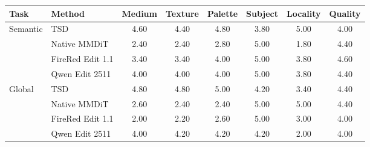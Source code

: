 \begin{tabular}{llcccccc}
\toprule
Task & Method & Medium & Texture & Palette & Subject & Locality & Quality \\
\midrule
Semantic & TSD & 4.60 & 4.40 & 4.80 & 3.80 & 5.00 & 4.00 \\
 & Native MMDiT & 2.40 & 2.40 & 2.80 & 5.00 & 1.80 & 4.40 \\
 & FireRed Edit 1.1 & 3.40 & 3.40 & 4.00 & 5.00 & 3.80 & 4.60 \\
 & Qwen Edit 2511 & 4.00 & 4.00 & 4.00 & 5.00 & 3.80 & 4.40 \\
\midrule
Global & TSD & 4.80 & 4.80 & 5.00 & 4.20 & 3.40 & 4.40 \\
 & Native MMDiT & 2.60 & 2.40 & 2.40 & 5.00 & 5.00 & 4.40 \\
 & FireRed Edit 1.1 & 2.00 & 2.20 & 2.60 & 5.00 & 3.00 & 4.00 \\
 & Qwen Edit 2511 & 4.00 & 4.20 & 4.20 & 4.20 & 2.00 & 4.00 \\
\bottomrule
\end{tabular}
